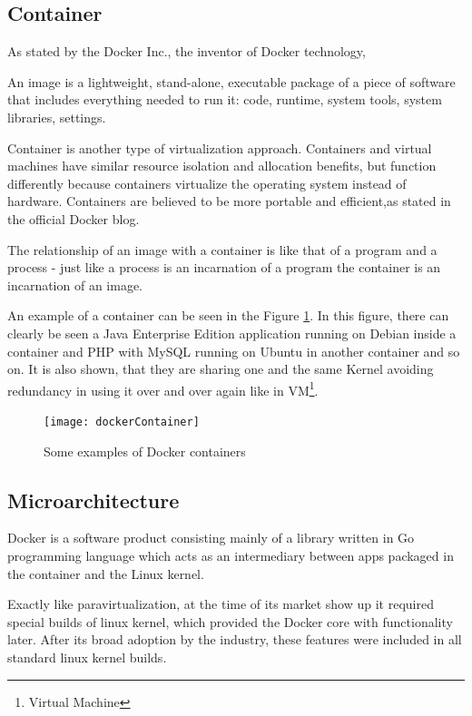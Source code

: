 \subsection{Container}

As stated by the Docker Inc., the inventor of Docker technology,

\begin{definition}
An image is a lightweight, stand-alone,
executable package of a piece of software that includes everything
needed to run it: code, runtime,
system tools, system libraries, settings\cite{DockerDefinition}.
\end{definition}

Container is another type of virtualization approach.
Containers and virtual machines have
similar resource isolation and allocation benefits,
but function differently because containers
virtualize the operating system instead of hardware.
Containers are believed to be more portable and
efficient,as stated in
the official Docker blog\cite{DockerEfficiency}.

The relationship of an image with
a container is like that of a program and a process -
just like a process is an incarnation of a program
the container is an incarnation of an image.

An example of a container can be
seen in the Figure \ref{fig:DockerContainerPic}.
In this figure, there can clearly be seen a Java Enterprise Edition application
running on Debian inside a container and PHP with MySQL running
on Ubuntu in another container and so on.
It is also shown, that they are sharing
one and the same Kernel avoiding redundancy in using it
over and over again like in VM\footnote{Virtual Machine}.

\begin{figure}
\texttt{[image: dockerContainer]}
\caption{Some examples of Docker containers}
\cite{DockerContainerPic}
\label{fig:DockerContainerPic}
\end{figure}

\subsection{Microarchitecture}

Docker is a software product consisting mainly of a
library written in Go programming language
which acts as an intermediary between apps packaged
in the container and the Linux kernel.

Exactly like paravirtualization, at the time of its market show up
it required special builds of linux kernel, which provided the Docker core with
functionality later. After its broad adoption by the industry, these features
were included in all standard linux kernel builds.

